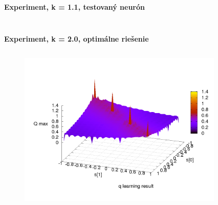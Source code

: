 \documentclass[xcolor=dvipsnames]{beamer}
\begin{document}
\begin{frame}{\bf Experiment, k = 1.1, testovaný neurón}
\begin{columns}
\begin{column}{0.5\textwidth}
\begin{figure}[ht]
        \end{figure}

	\end{column}
\end{columns}

\end{frame}


\begin{frame}{\bf Experiment, k = 2.0, optimálne riešenie}

\begin{columns}
	\begin{column}{0.5\textwidth}

        \begin{figure}[ht]

        \begin{center}
        \includegraphics[width=1.0\textwidth]{experiment_02/table/q_map.png}
        \end{center}

        \end{figure}

	\end{column}
	\begin{column}{0.5\textwidth}

        \begin{figure}[ht]


\end{figure}
\end{column}
\end{columns}
\end{frame}
\end{document}
